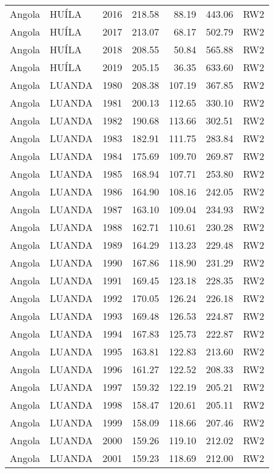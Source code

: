 \begin{longtable}{lllrrrl}
  Angola & HUÍLA & 2016 & 218.58 & 88.19 & 443.06 & RW2 \\ 
  Angola & HUÍLA & 2017 & 213.07 & 68.17 & 502.79 & RW2 \\ 
  Angola & HUÍLA & 2018 & 208.55 & 50.84 & 565.88 & RW2 \\ 
  Angola & HUÍLA & 2019 & 205.15 & 36.35 & 633.60 & RW2 \\ 
  Angola & LUANDA & 1980 & 208.38 & 107.19 & 367.85 & RW2 \\ 
  Angola & LUANDA & 1981 & 200.13 & 112.65 & 330.10 & RW2 \\ 
  Angola & LUANDA & 1982 & 190.68 & 113.66 & 302.51 & RW2 \\ 
  Angola & LUANDA & 1983 & 182.91 & 111.75 & 283.84 & RW2 \\ 
  Angola & LUANDA & 1984 & 175.69 & 109.70 & 269.87 & RW2 \\ 
  Angola & LUANDA & 1985 & 168.94 & 107.71 & 253.80 & RW2 \\ 
  Angola & LUANDA & 1986 & 164.90 & 108.16 & 242.05 & RW2 \\ 
  Angola & LUANDA & 1987 & 163.10 & 109.04 & 234.93 & RW2 \\ 
  Angola & LUANDA & 1988 & 162.71 & 110.61 & 230.28 & RW2 \\ 
  Angola & LUANDA & 1989 & 164.29 & 113.23 & 229.48 & RW2 \\ 
  Angola & LUANDA & 1990 & 167.86 & 118.90 & 231.29 & RW2 \\ 
  Angola & LUANDA & 1991 & 169.45 & 123.18 & 228.35 & RW2 \\ 
  Angola & LUANDA & 1992 & 170.05 & 126.24 & 226.18 & RW2 \\ 
  Angola & LUANDA & 1993 & 169.48 & 126.53 & 224.87 & RW2 \\ 
  Angola & LUANDA & 1994 & 167.83 & 125.73 & 222.87 & RW2 \\ 
  Angola & LUANDA & 1995 & 163.81 & 122.83 & 213.60 & RW2 \\ 
  Angola & LUANDA & 1996 & 161.27 & 122.52 & 208.33 & RW2 \\ 
  Angola & LUANDA & 1997 & 159.32 & 122.19 & 205.21 & RW2 \\ 
  Angola & LUANDA & 1998 & 158.47 & 120.61 & 205.11 & RW2 \\ 
  Angola & LUANDA & 1999 & 158.09 & 118.66 & 207.46 & RW2 \\ 
  Angola & LUANDA & 2000 & 159.26 & 119.10 & 212.02 & RW2 \\ 
  Angola & LUANDA & 2001 & 159.23 & 118.69 & 212.00 & RW2 \\ 

\end{longtable}
